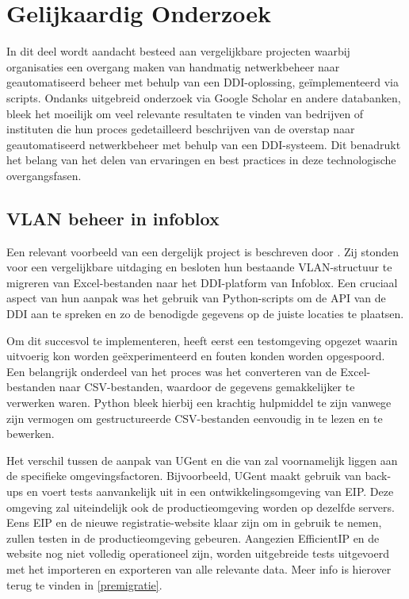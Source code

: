 \section{Gelijkaardig Onderzoek}
In dit deel wordt aandacht besteed aan vergelijkbare projecten waarbij organisaties een overgang maken van handmatig netwerkbeheer naar geautomatiseerd beheer met behulp van een DDI-oplossing, geïmplementeerd via scripts. Ondanks uitgebreid onderzoek via Google Scholar en andere databanken, bleek het moeilijk om veel relevante resultaten te vinden van bedrijven of instituten die hun proces gedetailleerd beschrijven van de overstap naar geautomatiseerd netwerkbeheer met behulp van een DDI-systeem. Dit benadrukt het belang van het delen van ervaringen en best practices in deze technologische overgangsfasen.

\subsection{VLAN beheer in infoblox}
Een relevant voorbeeld van een dergelijk project is beschreven door \textcite{Karaoui2023}. Zij stonden voor een vergelijkbare uitdaging en besloten hun bestaande VLAN-structuur te migreren van Excel-bestanden naar het DDI-platform van Infoblox. Een cruciaal aspect van hun aanpak was het gebruik van Python-scripts om de API van de DDI aan te spreken en zo de benodigde gegevens op de juiste locaties te plaatsen.

Om dit succesvol te implementeren, heeft \textcite{Karaoui2023} eerst een testomgeving opgezet waarin uitvoerig kon worden geëxperimenteerd en fouten konden worden opgespoord. Een belangrijk onderdeel van het proces was het converteren van de Excel-bestanden naar CSV-bestanden, waardoor de gegevens gemakkelijker te verwerken waren. Python bleek hierbij een krachtig hulpmiddel te zijn vanwege zijn vermogen om gestructureerde CSV-bestanden eenvoudig in te lezen en te bewerken.

Het verschil tussen de aanpak van UGent en die van \textcite{Karaoui2023} zal voornamelijk liggen aan de specifieke omgevingsfactoren. Bijvoorbeeld, UGent maakt gebruik van back-ups en voert tests aanvankelijk uit in een ontwikkelingsomgeving van EIP. Deze omgeving zal uiteindelijk ook de productieomgeving worden op dezelfde servers. Eens EIP en de nieuwe registratie-website klaar zijn om in gebruik te nemen, zullen testen in de productieomgeving gebeuren. Aangezien EfficientIP en de website nog niet volledig operationeel zijn, worden uitgebreide tests uitgevoerd met het importeren en exporteren van alle relevante data. Meer info is hierover terug te vinden in \ref{premigratie}.

